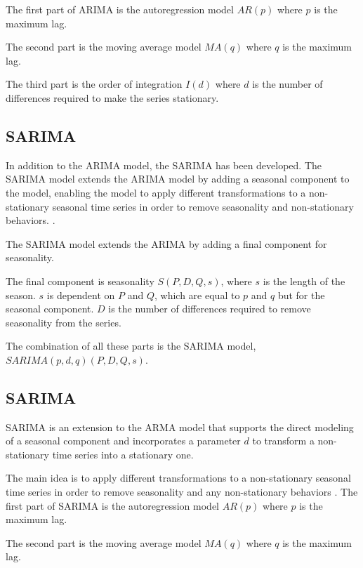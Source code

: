 The first part of ARIMA is the autoregression model
$AR(p)$ where $p$ is the maximum lag.

The second part is the moving average model $MA(q)$ where $q$ is the maximum lag.

The third part is the order of integration $I(d)$ where $d$ is the number of
differences required to make the series stationary.


\subsection{SARIMA}
In addition to the ARIMA model, the SARIMA has been developed.
The SARIMA model extends the ARIMA model by adding a seasonal component to the model,
enabling the model to apply different transformations to a non-stationary seasonal time series in order to remove seasonality and non-stationary behaviors.
\citep[p. 327-385]{Utlaut2008}.

The SARIMA model extends the ARIMA by adding a final component for seasonality.

The final component is seasonality $S(P, D, Q, s)$, where $s$ is the length
of the season.
$s$ is dependent on $P$ and $Q$, which are equal to $p$ and $q$ but for the seasonal component.
$D$ is the number of differences required to remove seasonality from the series.

The combination of all these parts is the SARIMA model,
$SARIMA(p, d, q)(P, D, Q, s)$.




\iffalse
  \subsection{SARIMA}
  SARIMA is an extension to the ARMA model that supports the direct modeling of a seasonal component and incorporates a parameter $d$
  to transform a non-stationary time series into a stationary one.

  The main idea is to apply different transformations to a non-stationary seasonal time series
  in order to remove seasonality and any non-stationary behaviors
  \citep[p. 327-385]{Utlaut2008}.
  The first part of SARIMA is the autoregression model
  $AR(p)$ where $p$ is the maximum lag.

  The second part is the moving average model $MA(q)$ where $q$ is the maximum lag.

